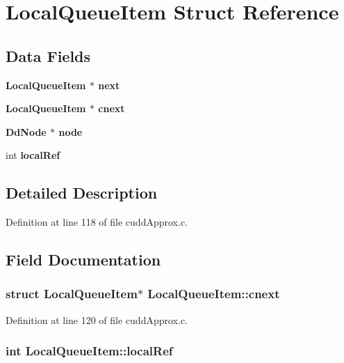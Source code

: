 \section{Local\-Queue\-Item Struct Reference}
\label{structLocalQueueItem}
\subsection*{Data Fields}
\begin{CompactItemize}
\item 
\bf{Local\-Queue\-Item} $\ast$ \bf{next}
\item 
\bf{Local\-Queue\-Item} $\ast$ \bf{cnext}
\item 
\bf{Dd\-Node} $\ast$ \bf{node}
\item 
int \bf{local\-Ref}
\end{CompactItemize}


\subsection{Detailed Description}




Definition at line 118 of file cudd\-Approx.c.

\subsection{Field Documentation}
\subsubsection{\setlength{\rightskip}{0pt plus 5cm}struct \bf{Local\-Queue\-Item}$\ast$ \bf{Local\-Queue\-Item::cnext}}\label{structLocalQueueItem_4caa52644550cb1d040536b9250f24d8}




Definition at line 120 of file cudd\-Approx.c.
\subsubsection{\setlength{\rightskip}{0pt plus 5cm}int \bf{Local\-Queue\-Item::local\-Ref}}\label{structLocalQueueItem_ee616cfd0782fd49fa5babae41f5460b}




